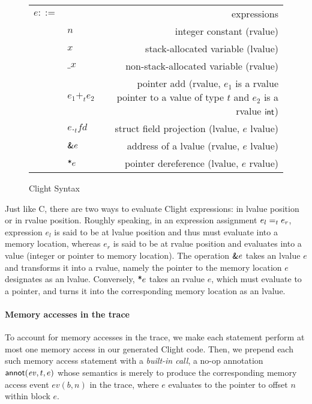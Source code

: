 \begin{figure}[h]
\begin{center}
\begin{tabularx}{\columnwidth}{rlR}
    $e ::= $ & & expressions \\
    & $n$    & integer constant (rvalue) \\
      & $x$                           & stack-allocated variable (lvalue) \\
      & $\_x$                           & non-stack-allocated variable (rvalue) \\ 
     & $e_1+_te_2$                        & pointer add (rvalue, $e_1$ is a rvalue pointer to a value of type $t$ and $e_2$ is a rvalue $\kw{int}$) \\
    & $e._tfd$ & struct field projection (lvalue, $e$ lvalue) \\
    & $\claddr{e}$ & address of a lvalue (rvalue, $e$ lvalue) \\
    & $\clderef{e}$ & pointer dereference (lvalue, $e$ rvalue)
  \end{tabularx}
\end{center}
\caption{Clight Syntax}
\label{fig:clight-syntax}
\end{figure}

Just like C, there are two ways to evaluate Clight expressions: in
lvalue position or in rvalue position. Roughly speaking, in an
expression assignment $\clwrite t{e_l}{e_r}$, expression $e_l$ is said to be at
lvalue position and thus must evaluate into a memory location, whereas
$e_r$ is said to be at rvalue position and evaluates into a value
(integer or pointer to memory location). The operation $\claddr{e}$
takes an lvalue $e$ and transforms it into a rvalue, namely the
pointer to the memory location $e$ designates as an
lvalue. Conversely, $\clderef{e}$ takes an rvalue $e$, which must
evaluate to a pointer, and turns it into the corresponding memory
location as an lvalue.

\paragraph{Memory accesses in the trace}
To account for memory accesses in the trace, we make each statement
perform at most one memory access in our generated Clight code. Then,
we prepend each such memory access statement with a \emph{built-in
  call}, a no-op annotation $\clannot(\mathit{ev},t,e)$ whose
semantics is merely to produce the corresponding memory access event
$\mathit{ev}(b, n)$ in the trace, where $e$ evaluates to the pointer
to offset $n$ within block $e$.

